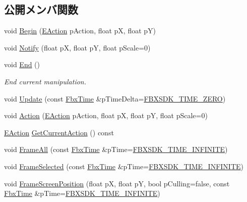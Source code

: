 \subsection*{公開メンバ関数}
\begin{DoxyCompactItemize}
\item 
void \hyperlink{class_fbx_camera_manipulator_a67dde46522f0fe7e3e3b10112e7a9c29}{Begin} (\hyperlink{class_fbx_camera_manipulator_ada0f93888edb4a1c0140e35f99eba922}{E\+Action} p\+Action, float pX, float pY)
\item 
void \hyperlink{class_fbx_camera_manipulator_af9008a220ef4a6ececcf46bb171656b4}{Notify} (float pX, float pY, float p\+Scale=0)
\item 
void \hyperlink{class_fbx_camera_manipulator_ae9eef6e3b92ce1b9f2a7da21a2487bb2}{End} ()
\begin{DoxyCompactList}\small\item\em End current manipulation. \end{DoxyCompactList}\item 
void \hyperlink{class_fbx_camera_manipulator_a0753a414b92367037fd96d588b0faba9}{Update} (const \hyperlink{class_fbx_time}{Fbx\+Time} \&p\+Time\+Delta=\hyperlink{fbxtime_8h_aa43cd11e74102affeac06402663d2653}{F\+B\+X\+S\+D\+K\+\_\+\+T\+I\+M\+E\+\_\+\+Z\+E\+RO})
\item 
void \hyperlink{class_fbx_camera_manipulator_a87d5576928c945640be5414d945feab5}{Action} (\hyperlink{class_fbx_camera_manipulator_ada0f93888edb4a1c0140e35f99eba922}{E\+Action} p\+Action, float pX, float pY, float p\+Scale=0)
\item 
\hyperlink{class_fbx_camera_manipulator_ada0f93888edb4a1c0140e35f99eba922}{E\+Action} \hyperlink{class_fbx_camera_manipulator_a93f3cd6487e8f10c9accb6db1022e397}{Get\+Current\+Action} () const
\item 
void \hyperlink{class_fbx_camera_manipulator_a78fab2478759b295c01ab4a4e5f716e9}{Frame\+All} (const \hyperlink{class_fbx_time}{Fbx\+Time} \&p\+Time=\hyperlink{fbxtime_8h_a1e6db3fe0f84f0b7daa775739f93526f}{F\+B\+X\+S\+D\+K\+\_\+\+T\+I\+M\+E\+\_\+\+I\+N\+F\+I\+N\+I\+TE})
\item 
void \hyperlink{class_fbx_camera_manipulator_a7c286fb462b04bc029f72e82e61cdc72}{Frame\+Selected} (const \hyperlink{class_fbx_time}{Fbx\+Time} \&p\+Time=\hyperlink{fbxtime_8h_a1e6db3fe0f84f0b7daa775739f93526f}{F\+B\+X\+S\+D\+K\+\_\+\+T\+I\+M\+E\+\_\+\+I\+N\+F\+I\+N\+I\+TE})
\item 
void \hyperlink{class_fbx_camera_manipulator_a622a6f144dede94c05ed63c80832f25f}{Frame\+Screen\+Position} (float pX, float pY, bool p\+Culling=false, const \hyperlink{class_fbx_time}{Fbx\+Time} \&p\+Time=\hyperlink{fbxtime_8h_a1e6db3fe0f84f0b7daa775739f93526f}{F\+B\+X\+S\+D\+K\+\_\+\+T\+I\+M\+E\+\_\+\+I\+N\+F\+I\+N\+I\+TE})
\end{DoxyCompactItemize}
